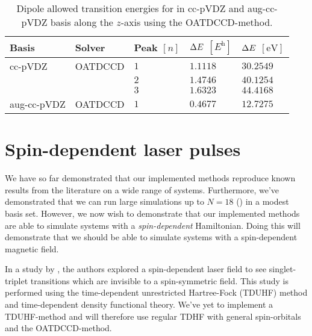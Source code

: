         \begin{table}
            \centering
            \caption{Dipole allowed transition energies for  in cc-pVDZ
            and aug-cc-pVDZ basis along the $z$-axis using the OATDCCD-method.}
            \renewcommand{\arraystretch}{1.3}
            \begin{tabular}{@{}lllll@{}}
                \toprule
                Basis & Solver & Peak $[n]$
                & $\Delta E$ $[\si{\hartree}]$
                & $\Delta E$ $[\si{\electronvolt}]$
                \\
                \midrule
                cc-pVDZ & OATDCCD & $1$ & $1.1118$ & $30.2549$ \\
                & & $2$ & $1.4746$ & $40.1254$ \\
                & & $3$ & $1.6323$ & $44.4168$ \\
                aug-cc-pVDZ & OATDCCD & $1$ & $0.4677$ & $12.7275$ \\
                \bottomrule
            \end{tabular}
            \label{tab:dipole-ar}
        \end{table}

    \section{Spin-dependent laser pulses}
        \label{sec:isborn}
        We have so far demonstrated that our implemented methods reproduce known
        results from the literature on a wide range of systems.
        Furthermore, we've demonstrated that we can run large simulations up to
        $N = 18$ () in a modest basis set.
        However, we now wish to demonstrate that our implemented methods are
        able to simulate systems with a \emph{spin-dependent} Hamiltonian.
        Doing this will demonstrate that we should be able to simulate systems
        with a spin-dependent magnetic field.

        In a study by \citeauthor{isborn} \cite{isborn}, the authors explored a
        spin-dependent laser field to see singlet-triplet transitions which are
        invisible to a spin-symmetric field.
        This study is performed using the time-dependent unrestricted
        Hartree-Fock (TDUHF) method and time-dependent density functional theory.
        We've yet to implement a TDUHF-method and will therefore use regular
        TDHF with general spin-orbitals and the OATDCCD-method.

